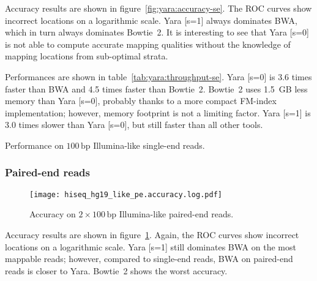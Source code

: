 Accuracy results are shown in figure~\ref{fig:yara:accuracy-se}.
The ROC curves show incorrect locations on a logarithmic scale.
Yara [s=1] always dominates BWA, which in turn always dominates Bowtie~2.
It is interesting to see that Yara [s=0] is not able to compute accurate mapping qualities without the knowledge of mapping locations from sub-optimal strata.

Performances are shown in table~\ref{tab:yara:throughput-se}.
Yara [s=0] is 3.6 times faster than BWA and 4.5 times faster than Bowtie~2.
Bowtie~2 uses 1.5~GB less memory than Yara [s=0], probably thanks to a more compact FM-index implementation; however, memory footprint is not a limiting factor.
Yara [s=1] is 3.0 times slower than Yara [s=0], but still faster than all other tools.

\begin{table}[b]
\begin{center}
\caption[Yara performance on Illumina-like single-end reads]{Performance on $100\,\text{bp}$ Illumina-like single-end reads.}
\sffamily

\label{tab:yara:throughput-se}
\end{center}
\end{table}

\subsubsection{Paired-end reads}

\begin{figure}[t]
\begin{center}
\caption[Yara accuracy on Illumina-like paired-end reads]{Accuracy on $2 \times 100\,\text{bp}$ Illumina-like paired-end reads.}
\label{fig:yara:accuracy-pe}
\texttt{[image: hiseq\_hg19\_like\_pe.accuracy.log.pdf]}
\end{center} 
\end{figure}

Accuracy results are shown in figure~\ref{fig:yara:accuracy-pe}.
Again, the ROC curves show incorrect locations on a logarithmic scale.
Yara [s=1] still dominates BWA on the most mappable reads; however, compared to single-end reads, BWA on paired-end reads is closer to Yara.
Bowtie~2 shows the worst accuracy. 

